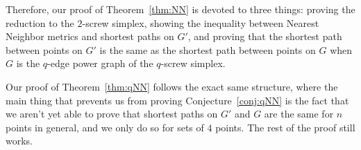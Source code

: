 Therefore, our proof of Theorem~\ref{thm:NN} is devoted to three things:
proving the reduction to the $2$-screw simplex, showing the inequality
between Nearest Neighbor metrics and shortest paths on $G'$, and proving
that the shortest path between points on $G'$ is the same as the shortest
path between points on $G$ when $G$ is the $q$-edge power graph of the
$q$-screw simplex.

Our proof of Theorem~\ref{thm:qNN} follows the exact same structure, where
the main thing that prevents us from proving Conjecture~\ref{conj:qNN} is
the fact that we aren't yet able to prove that shortest paths on $G'$ and
$G$ are the same for $n$ points in general, and we only do so for sets of
$4$ points. The rest of the proof still works.


